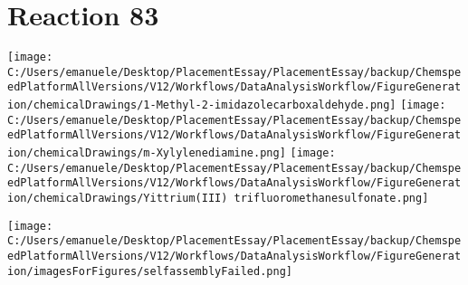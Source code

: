 \documentclass{article}%
\begin{document}
\section*{Reaction 83}%
%
\begin{scheme}[H]%
\begin{minipage}{0.5\textwidth}%
\texttt{[image: C:/Users/emanuele/Desktop/PlacementEssay/PlacementEssay/backup/ChemspeedPlatformAllVersions/V12/Workflows/DataAnalysisWorkflow/FigureGeneration/chemicalDrawings/1-Methyl-2-imidazolecarboxaldehyde.png]}%
\texttt{[image: C:/Users/emanuele/Desktop/PlacementEssay/PlacementEssay/backup/ChemspeedPlatformAllVersions/V12/Workflows/DataAnalysisWorkflow/FigureGeneration/chemicalDrawings/m-Xylylenediamine.png]}%
\texttt{[image: C:/Users/emanuele/Desktop/PlacementEssay/PlacementEssay/backup/ChemspeedPlatformAllVersions/V12/Workflows/DataAnalysisWorkflow/FigureGeneration/chemicalDrawings/Yittrium(III) trifluoromethanesulfonate.png]}%
\end{minipage}%
\begin{minipage}{0.5\textwidth}%
\begin{center}%
\texttt{[image: C:/Users/emanuele/Desktop/PlacementEssay/PlacementEssay/backup/ChemspeedPlatformAllVersions/V12/Workflows/DataAnalysisWorkflow/FigureGeneration/imagesForFigures/selfassemblyFailed.png]}%
\end{center}%
\end{minipage}%
\caption{Self-assembly of components 12, 18, with Yittrium(III) in a 3.0:1.5:1.0 molar ratio in CH$_3$CN at 60\textdegree C for 40h. These are the reagents (starting materials) for reaction 83.}%
\end{scheme}%
\end{document}
